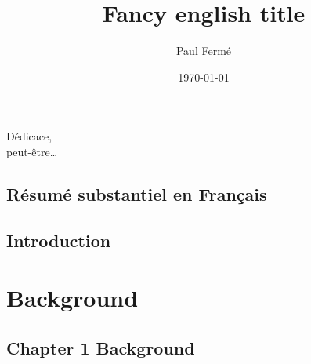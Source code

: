 \documentclass[a4paper, 11pt]{memoir}
\title{Fancy english title}
\author{Paul Fermé}
\date{\today}
\begin{document}

\frontmatter

\cleardoublepage
{}
\begin{flushright}
\begin{otherlanguage}{french}
  Dédicace,\\
  peut-être\ldots
\end{otherlanguage}
\end{flushright}





\cleardoublepage
\tableofcontents

\cleardoublepage


\begin{otherlanguage}{french}
\chapter{Résumé substantiel en Français}
\label{ch:resume-fr}


\end{otherlanguage}

\mainmatter
\pagestyle{ruled}

\chapter{Introduction}
\label{ch:introduction}



\cleardoublepage
{\let\newpage\relax
\part{Background}
\label{pa:background}
}

\chapter{Chapter 1 Background} \label{ch:background-one}


\end{document}
